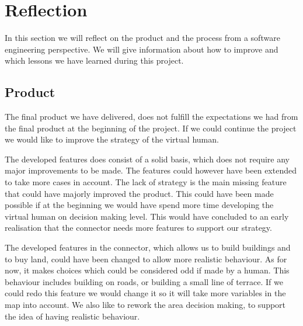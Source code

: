 \section{Reflection}
In this section we will reflect on the product and the process from a software engineering perspective. We will give information about how to improve and which lessons we have learned during this project.
\subsection{Product}
The final product we have delivered, does not fulfill the expectations we had from the final product at the beginning of the project. If we could continue the project we would like to improve the strategy of the virtual human.

The developed features does consist of a solid basis, which does not require any major improvements to be made. The features could however have been extended to take more cases in account. The lack of strategy is the main missing feature that could have majorly improved the product. This could have been made possible if at the beginning we would have spend more time developing the virtual human on decision making level. This would have concluded to an early realisation that the connector needs more features to support our strategy.

The developed features in the connector, which allows us to build buildings and to buy land, could have been changed to allow more realistic behaviour. As for now, it makes choices which could be considered odd if made by a human. This behaviour includes building on roads, or building a small line of terrace. If we could redo this feature we would change it so it will take more variables in the map into account. We also like to rework the area decision making, to support the idea of having realistic behaviour.




